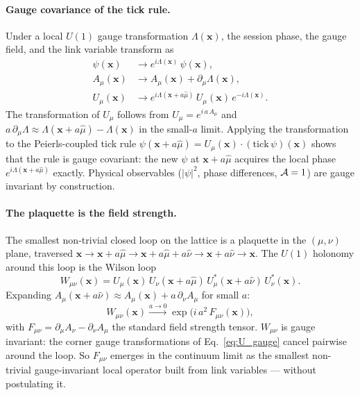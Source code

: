\paragraph{Gauge covariance of the tick rule.}
Under a local $U(1)$ gauge transformation
$\Lambda(\mathbf{x})$, the session phase, the gauge field, and the
link variable transform as
\begin{align}
    \psi(\mathbf{x}) &\to e^{i\Lambda(\mathbf{x})}\,\psi(\mathbf{x}),
        \label{eq:psi_gauge} \\
    A_\mu(\mathbf{x}) &\to A_\mu(\mathbf{x}) + \partial_\mu\Lambda(\mathbf{x}),
        \label{eq:A_gauge} \\
    U_\mu(\mathbf{x}) &\to e^{i\Lambda(\mathbf{x}+a\hat{\mu})}\,U_\mu(\mathbf{x})\,e^{-i\Lambda(\mathbf{x})}.
        \label{eq:U_gauge}
\end{align}
The transformation of $U_\mu$ follows from
$U_\mu = e^{i\,a\,A_\mu}$ and
$a\,\partial_\mu\Lambda \approx \Lambda(\mathbf{x}+a\hat{\mu}) - \Lambda(\mathbf{x})$
in the small-$a$ limit. Applying the transformation to the
Peierls-coupled tick rule
$\psi(\mathbf{x}+a\hat{\mu}) = U_\mu(\mathbf{x})\cdot(\text{tick}\,\psi)(\mathbf{x})$
shows that the rule is gauge covariant: the new $\psi$ at
$\mathbf{x}+a\hat{\mu}$ acquires the local phase
$e^{i\Lambda(\mathbf{x}+a\hat{\mu})}$ exactly. Physical observables
($|\psi|^2$, phase differences, $\mathcal{A}=1$) are gauge invariant by
construction.

\paragraph{The plaquette is the field strength.}
The smallest non-trivial closed loop on the lattice is a plaquette in
the $(\mu, \nu)$ plane, traversed
$\mathbf{x} \to \mathbf{x}+a\hat{\mu} \to \mathbf{x}+a\hat{\mu}+a\hat{\nu} \to \mathbf{x}+a\hat{\nu} \to \mathbf{x}$.
The $U(1)$ holonomy around this loop is the Wilson loop
\begin{equation}
    W_{\mu\nu}(\mathbf{x}) =
        U_\mu(\mathbf{x})\,U_\nu(\mathbf{x}+a\hat{\mu})\,
        U_\mu^*(\mathbf{x}+a\hat{\nu})\,U_\nu^*(\mathbf{x}).
    \label{eq:wilson_loop}
\end{equation}
Expanding $A_\mu(\mathbf{x}+a\hat{\nu}) \approx A_\mu(\mathbf{x}) + a\,\partial_\nu A_\mu$ for small $a$:
\begin{equation}
    W_{\mu\nu}(\mathbf{x})
        \xrightarrow{a\to 0}
        \exp\!\bigl(i\,a^2\,F_{\mu\nu}(\mathbf{x})\bigr),
    \label{eq:wilson_to_F}
\end{equation}
with
$F_{\mu\nu} = \partial_\mu A_\nu - \partial_\nu A_\mu$ the standard
field strength tensor.
$W_{\mu\nu}$ is gauge invariant: the corner gauge transformations of
Eq.~\eqref{eq:U_gauge} cancel pairwise around the loop. So
$F_{\mu\nu}$ emerges in the continuum limit as the smallest
non-trivial gauge-invariant local operator built from link variables
--- without postulating it.

